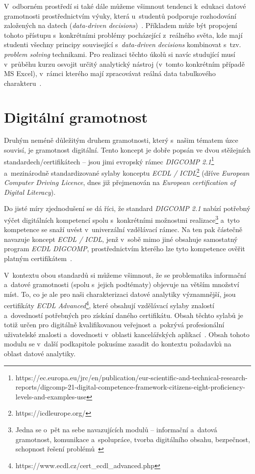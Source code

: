 V~odborném prostředí si také dále můžeme všimnout tendenci k~edukaci datové gramotnosti prostřednictvím výuky, která u~studentů podporuje rozhodování založených na datech (\emph{data-driven decisions})~\parencite{mandinach13}. Příkladem může být propojení tohoto přístupu s~konkrétními problémy pocházející z~reálného světa, kde mají studenti všechny principy související s~\emph{data-driven decisions} kombinovat s~tzv. \emph{problem solving} technikami. Pro realizaci těchto úkolů si navíc studující musí v~průběhu kurzu osvojit určitý analytický nástroj (v~tomto konkrétním případě MS Excel), v~rámci kterého mají zpracovávat reálná data tabulkového charakteru~\parencite{slayter17}.

\hypertarget{digituxe1lnuxed-gramotnost}{%
\section{Digitální gramotnost}\label{digituxe1lnuxed-gramotnost}}

Druhým neméně důležitým druhem gramotnosti, který s~našim tématem úzce souvisí, je gramotnost digitální. Tento koncept je dobře popsán ve dvou stěžejních standardech/certifikátech -- jsou jimi evropský rámec \emph{DIGCOMP 2.1}\footnote{https://ec.europa.eu/jrc/en/publication/eur-scientific-and-technical-research-reports/digcomp-21-digital-competence-framework-citizens-eight-proficiency-levels-and-examples-use} a~mezinárodně standardizované sylaby konceptu \emph{ECDL / ICDL}\footnote{https://icdleurope.org/} (dříve \emph{European Computer Driving Licence}, dnes již přejmenován na \emph{European certification of Digital Literacy}).

Do jisté míry zjednodušení se dá říci, že standard \emph{DIGCOMP 2.1} nabízí potřebný výčet digitálních kompetencí spolu s~konkrétními možnostmi realizace\footnote{Jedna se o~pět na sebe navazujících modulů – informační a~datová gramotnost, komunikace a~spolupráce, tvorba digitálního obsahu, bezpečnost, schopnost řešení problémů~\parencite{digicomp17}} a~tyto kompetence se snaží uvést v~univerzální vzdělávací rámec. Na ten pak částečně navazuje koncept \emph{ECDL / ICDL}, jenž v~sobě mimo jiné obsahuje samostatný program \emph{ECDL DIGCOMP}, prostřednictvím kterého lze tyto kompetence ověřit platným certifikátem~\parencite{chabera21}.

V~kontextu obou standardů si můžeme všimnout, že se problematika informační a~datové gramotnosti (spolu s~jejich podtématy) objevuje na větším množství míst. To, co je ale pro naši charakterizaci datové analytiky významnější, jsou certifikáty \emph{ECDL Advanced}\footnote{https://www.ecdl.cz/cert\_ecdl\_advanced.php}, které obsahují vzdělávací sylaby znalostí a~dovedností potřebných pro získání daného certifikátu. Obsah těchto sylabů je totiž určen pro digitálně kvalifikovanou veřejnost a~pokrývá profesionální uživatelské znalosti a~dovednosti v~oblasti kancelářských aplikací~\parencite{ecdl17}. Obsah tohoto modulu se v~další podkapitole pokusíme zasadit do kontextu požadavků na oblast datové analytiky.


